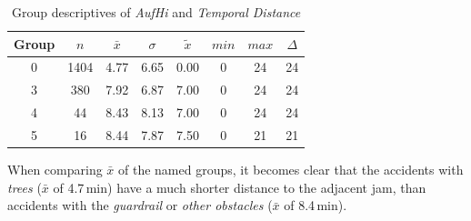 \begin{table}[ht!]
	\tiny
	\centering
    \begin{tabular}{c|c|c|c|c|c|c|c}
        \toprule
        Group & $n$ & $\bar{x}$ & $\sigma$ & $\tilde{x}$ & $min$ & $max$ & $\Delta$ \\ 
        \midrule
        0 & 1404 & 4.77 & 6.65 & 0.00 & 0 & 24 & 24 \\ 
        3 & 380 & 7.92 & 6.87 & 7.00 & 0 & 24 & 24 \\ 
        4 & 44   & 8.43 & 8.13 & 7.00 & 0 & 24 & 24 \\ 
        5 & 16   & 8.44 & 7.87 & 7.50 & 0 & 21 & 21 \\ 
        \bottomrule
      \end{tabular}
	\caption{Group descriptives of \textit{AufHi} and \textit{Temporal Distance}}
	\label{tbl:descriptives_baysis_matched_AufHi_TDist}
\end{table}
When comparing $\bar{x}$ of the named groups, it becomes clear that the accidents with \textit{trees} ($\bar{x}$ of 4.7\,min) have a much shorter distance to the adjacent jam, than accidents with the \textit{guardrail} or \textit{other obstacles} ($\bar{x}$ of 8.4\,min).

